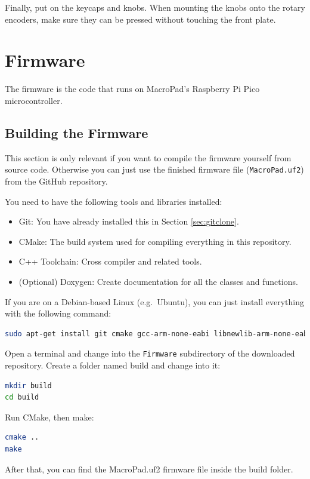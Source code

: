 \documentclass{article}
\newenvironment{note}{\begin{tcolorbox}[colback=blue!5!white,colframe=blue!75!black,title=\textbf{Note}]}{\end{tcolorbox}}
\newcommand{\file}[1]{\texttt{#1}}
\begin{document}
Finally, put on the keycaps and knobs. When mounting the knobs onto the rotary encoders, make sure they can be pressed without touching the front plate. 

\section{Firmware}
The firmware is the code that runs on MacroPad's Raspberry Pi Pico microcontroller.

\subsection{Building the Firmware}\label{sec:fwcompile}
\begin{note}
This section is only relevant if you want to compile the firmware yourself from source code.
Otherwise you can just use the finished firmware file (\file{MacroPad.uf2}) from the GitHub repository.
\end{note}

You need to have the following tools and libraries installed:
\begin{itemize}
\item Git: You have already installed this in Section \ref{sec:gitclone}.
\item CMake: The build system used for compiling everything in this repository.
\item C++ Toolchain: Cross compiler and related tools.
\item (Optional) Doxygen: Create documentation for all the classes and functions.
\end{itemize}

If you are on a Debian-based Linux (e.g.\ Ubuntu), you can just install everything with the following command:
\begin{lstlisting}[language=bash]
sudo apt-get install git cmake gcc-arm-none-eabi libnewlib-arm-none-eabi build-essential g++ libstdc++-arm-none-eabi-newlib doxygen
\end{lstlisting}

Open a terminal and change into the \file{Firmware} subdirectory of the downloaded repository. Create a folder named build and change into it:
\begin{lstlisting}[language=bash]
mkdir build
cd build
\end{lstlisting}
Run CMake, then make:
\begin{lstlisting}[language=bash]
cmake ..
make
\end{lstlisting}
After that, you can find the MacroPad.uf2 firmware file inside the build folder.
\end{document}
